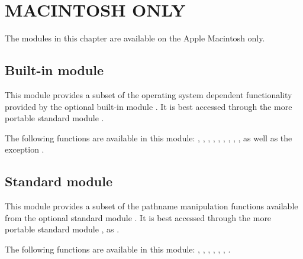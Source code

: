 \chapter{MACINTOSH ONLY}

The modules in this chapter are available on the Apple Macintosh only.

\section{Built-in module }

This module provides a subset of the operating system dependent
functionality provided by the optional built-in module .
It is best accessed through the more portable standard module
.

The following functions are available in this module:
,
,
,
,
,
,
,
,
,
as well as the exception .

\section{Standard module }

This module provides a subset of the pathname manipulation functions
available from the optional standard module .  It is
best accessed through the more portable standard module , as
.

The following functions are available in this module:
,
,
,
,
,
,
.




